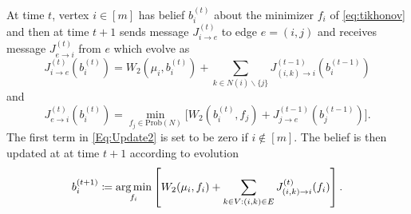 \documentclass[letterpaper]{article} %
\begin{document}
At time $t$, vertex $i\in [m]$ has belief $b^{(t)}_i$ about the minimizer $f_i$ of \eqref{eq:tikhonov} and then at time $t+1$ sends message $J^{(t)}_{i\to e}$ to edge $e=(i, j)$ and receives message $J^{(t)}_{e\to i}$ from $e$ which evolve as
\begin{equation}\label{Eq:Update2}
J^{(t)}_{i\to e} (b^{(t)}_i) = W_2(\mu_i, b^{(t)}_i) + \sum_{k\in N(i)\backslash \{j\}}J^{(t-1)}_{(i,k)\to i}(b^{(t-1)}_i)
\end{equation}
and 
\begin{equation}\label{Eq:Update}
    J^{(t)}_{e\to i}(b^{(t)}_i) =  \min_{f_j\in \mathrm{Prob}(N)}\Big[W_2(b^{(t)}_i, f_j) + J^{(t-1)}_{j\to e}(b^{(t-1)}_j)\Big].
\end{equation}
The first term in \eqref{Eq:Update2} is set to be zero if $i\notin [m]$. The belief is then updated at at time $t+1$ according to evolution
$$b^{(t+1)}_i \coloneqq \mathop{\rm arg\, min}_{f_i} \left[W_2(\mu_i, f_i) + \sum_{k\in V: (i, k)\in E } J^{(t)}_{(i, k)\to i}(f_i)\right].$$
\end{document}

